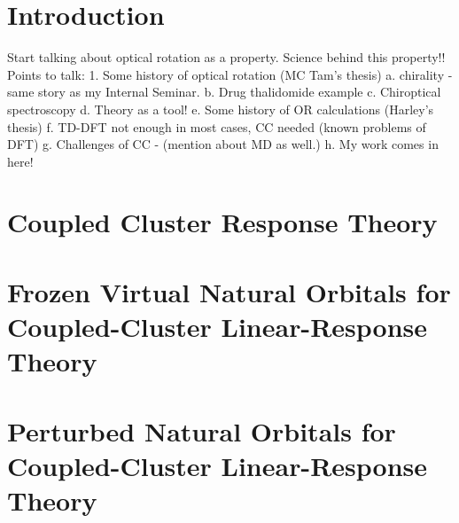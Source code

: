 \documentclass[12pt]{report}
\begin{document}
\tableofcontents
\pagebreak

\listoffigures
\pagebreak

\listoftables
\pagebreak

\pagestyle{myheadings}

\chapter{Introduction}

Start talking about optical rotation as a property. Science behind this property!!
Points to talk:
1. Some history of optical rotation (MC Tam's thesis)
	a. chirality - same story as my Internal Seminar.
	b. Drug thalidomide example
	c. Chiroptical spectroscopy
	d. Theory as a tool! 
	e. Some history of OR calculations (Harley's thesis)
	f. TD-DFT not enough in most cases, CC needed (known problems of DFT)
	g. Challenges of CC - (mention about MD as well.) 
	h. My work comes in here!

\chapter{Coupled Cluster Response Theory}
\chapter{Frozen Virtual Natural Orbitals for Coupled-Cluster Linear-Response Theory}

\chapter{Perturbed Natural Orbitals for Coupled-Cluster Linear-Response Theory}

\end{document}
